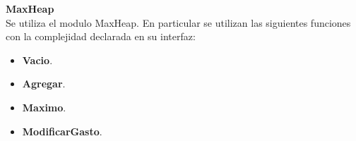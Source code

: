 \documentclass[../main.tex]{subfiles}
\begin{document}
\begin{servicios}
\begin{itemize}
    \end{itemize}
    
    {\large\bfseries MaxHeap\\}
    Se utiliza el modulo MaxHeap. En particular se utilizan las siguientes funciones con la complejidad declarada en su interfaz:\par
    \begin{itemize}
        \item  \textbf{Vacio}.
        \item  \textbf{Agregar}.
        \item \textbf{Maximo}.
        \item  \textbf{ModificarGasto}.
         
    \end{itemize}
\end{servicios}
\end{document}
